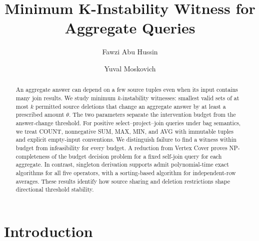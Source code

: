 \documentclass[sigconf, nonacm, pbalance]{acmart}
\theoremstyle{acmplain}
\theoremstyle{acmdefinition}
\theoremstyle{acmplain}
\begin{document}
\title{Minimum K-Instability Witness for Aggregate Queries}
\author{Fawzi Abu Hussin}

\author{Yuval Moskovich}

\begin{abstract}
An aggregate answer can depend on a few source tuples even when its input
contains many join results. We study minimum $k$-instability witnesses:
smallest valid sets of at most $k$ permitted source deletions that change
an aggregate answer by at least a prescribed amount $\theta$. The two
parameters separate the intervention budget from the answer-change
threshold. For positive select--project--join queries under bag semantics,
we treat COUNT, nonnegative SUM, MAX, MIN, and AVG with immutable tuples
and explicit empty-input conventions. We distinguish failure to find a
witness within budget from infeasibility for every budget. A reduction from
Vertex Cover proves NP-completeness of the budget decision problem for a
fixed self-join query for each aggregate. In contrast, singleton derivation
supports admit polynomial-time exact algorithms for all five operators,
with a sorting-based algorithm for independent-row averages. These results
identify how source sharing and deletion restrictions shape directional
threshold stability.
\end{abstract}

\maketitle

\vldbtopmatter



\section{Introduction}
\label{sec:introduction}








\begingroup


\endgroup
\end{document}

